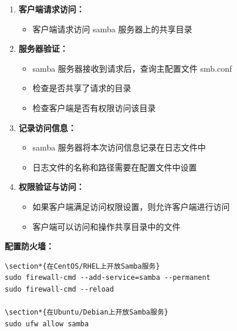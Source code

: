 \documentclass[12pt,UTF8]{ctexbook}
\begin{document}
\begin{enumerate}
    \item \textbf{客户端请求访问：}
    \begin{itemize}
        \item 客户端请求访问 samba 服务器上的共享目录
    \end{itemize}
    
    \item \textbf{服务器验证：}
    \begin{itemize}
        \item samba 服务器接收到请求后，查询主配置文件 smb.conf
        \item 检查是否共享了请求的目录
        \item 检查客户端是否有权限访问该目录
    \end{itemize}
    
    \item \textbf{记录访问信息：}
    \begin{itemize}
        \item samba 服务器将本次访问信息记录在日志文件中
        \item 日志文件的名称和路径需要在配置文件中设置
    \end{itemize}
    
    \item \textbf{权限验证与访问：}
    \begin{itemize}
        \item 如果客户端满足访问权限设置，则允许客户端进行访问
        \item 客户端可以访问和操作共享目录中的文件
    \end{itemize}
\end{enumerate}

\textbf{配置防火墙：}
\begin{verbatim}
\section*{在CentOS/RHEL上开放Samba服务}
sudo firewall-cmd --add-service=samba --permanent
sudo firewall-cmd --reload

\section*{在Ubuntu/Debian上开放Samba服务}
sudo ufw allow samba
\end{verbatim}
\end{document}
